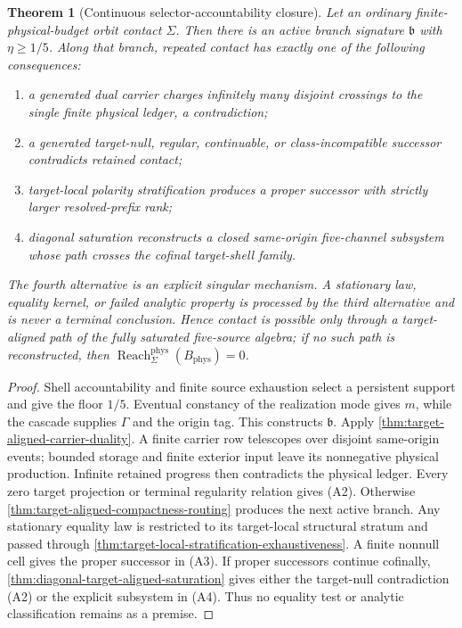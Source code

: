 \documentclass[11pt]{article}
\numberwithin{section}{part}
\theoremstyle{plain}
\newtheorem{theorem}{Theorem}[section]
\theoremstyle{definition}
\theoremstyle{remark}
\newcommand{\Reach}{\operatorname{Reach}}
\newcommand{\Phys}{\mathrm{phys}}
\newcommand{\Budget}{B_{\Phys}}
\begin{document}
\begin{theorem}[Continuous selector-accountability closure]
\label{thm:continuous-selector-accountability-closure}
Let an ordinary finite-physical-budget orbit contact \(\Sigma\).  Then there
is an active branch signature \(\mathfrak b\) with
\(\eta\ge1/5\).  Along that branch, repeated contact has exactly one of the
following consequences:
\begin{enumerate}[label=\textup{(A\arabic*)}]
\item a generated dual carrier charges infinitely many disjoint crossings to
the single finite physical ledger, a contradiction;
\item a generated target-null, regular, continuable, or class-incompatible
successor contradicts retained contact;
\item target-local polarity stratification produces a proper successor with
strictly larger resolved-prefix rank;
\item diagonal saturation reconstructs a closed same-origin five-channel
subsystem whose path crosses the cofinal target-shell family.
\end{enumerate}
The fourth alternative is an explicit singular mechanism.  A stationary
law, equality kernel, or failed analytic property is processed by the third
alternative and is never a terminal conclusion.  Hence contact is possible
only through a target-aligned path of the fully saturated five-source
algebra; if no such path is reconstructed, then
\(\Reach_\Sigma^{\Phys}(\Budget)=0\).
\end{theorem}

\begin{proof}
Shell accountability and finite source exhaustion select a persistent
support and give the floor \(1/5\).  Eventual constancy of the realization
mode gives \(m\), while the cascade supplies \(\Gamma\) and the origin tag.
This constructs \(\mathfrak b\).  Apply
\cref{thm:target-aligned-carrier-duality}.  A finite carrier row telescopes
over disjoint same-origin events; bounded storage and finite exterior input
leave its nonnegative physical production.  Infinite retained progress then
contradicts the physical ledger.  Every zero target projection or terminal
regularity relation gives \textup{(A2)}.  Otherwise
\cref{thm:target-aligned-compactness-routing} produces the next active branch.
Any stationary equality law is restricted to its target-local structural
stratum and passed through
\cref{thm:target-local-stratification-exhaustiveness}.  A finite nonnull cell
gives the proper successor in \textup{(A3)}.  If proper successors continue
cofinally, \cref{thm:diagonal-target-aligned-saturation} gives either the
target-null contradiction \textup{(A2)} or the explicit subsystem in
\textup{(A4)}.  Thus no equality test or analytic classification remains as
a premise.
\end{proof}
\end{document}
